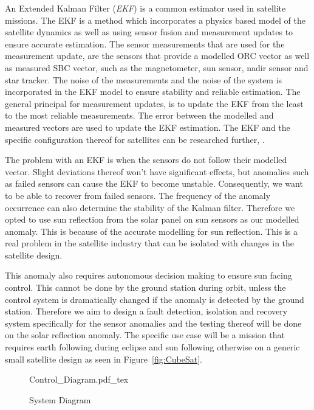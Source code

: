 \documentclass[letterpaper, 10 pt, conference]{ieeeconf}  %
\begin{document}
An Extended Kalman Filter (\emph{EKF}) is a common estimator used in satellite missions. The EKF is a method which incorporates a physics based model of the satellite dynamics as well as using sensor fusion and measurement updates to ensure accurate estimation. The sensor measurements that are used for the measurement update, are the sensors that provide a modelled ORC vector as well as measured SBC vector, such as the magnetometer, sun sensor, nadir sensor and star tracker. The noise of the measurements and the noise of the system is incorporated in the EKF model to ensure stability and reliable estimation. The general principal for measurement updates, is to update the EKF from the least to the most reliable measurements. The error between the modelled and measured vectors are used to update the EKF estimation. The EKF and the specific configuration thereof for satellites can be researched further, \textcite{JansevanVuuren2015}. 

The problem with an EKF is when the sensors do not follow their modelled vector. Slight deviations thereof won't have significant effects, but anomalies such as failed sensors can cause the EKF to become unstable. Consequently, we want to be able to recover from failed sensors. The frequency of the anomaly occurrence can also determine the stability of the Kalman filter. Therefore we opted to use sun reflection from the solar panel on sun sensors as our modelled anomaly. This is because of the accurate modelling for sun reflection. This is a real problem in the satellite industry that can be isolated with changes in the satellite design.

This anomaly also requires autonomous decision making to ensure sun facing control. This cannot be done by the ground station during orbit, unless the control system is dramatically changed if the anomaly is detected by the ground station. Therefore we aim to design a fault detection, isolation and recovery system specifically for the sensor anomalies and the testing thereof will be done on the solar reflection anomaly. The specific use case will be a mission that requires earth following during eclipse and sun following otherwise on a generic small satellite design as seen in Figure~\ref{fig:CubeSat}.

\begin{figure*}[h!b!t]
	\centering
	\def\svgwidth{14cm}
	{Control_Diagram.pdf_tex}
	\caption{System Diagram}
	\label{fig:System_Diagram}
\end{figure*}
\end{document}
